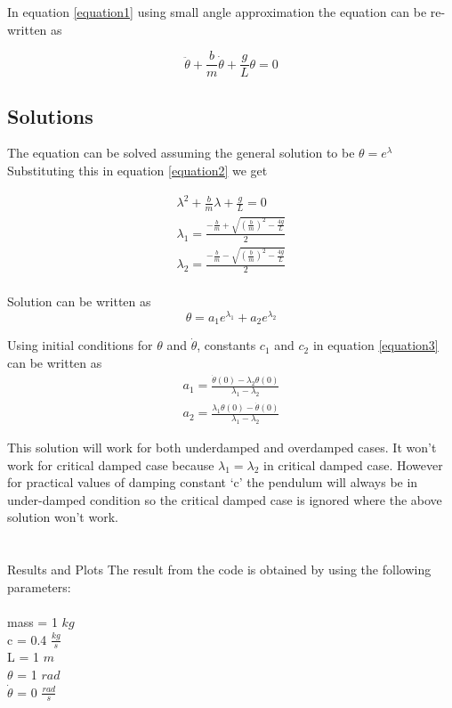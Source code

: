 \documentclass[12pt, a4paper]{report}
\begin{document}
In equation \ref{equation1} using small angle approximation the equation can be re-written as

\begin{equation}
\label{equation2}
\ddot{\theta} + \frac{b}{m}\dot{\theta} + \frac{g}{L}\theta = 0
\end{equation}

\subsection*{Solutions}
The equation can be solved assuming the general solution to be $\theta = e^{\lambda}$
Substituting this in equation \ref{equation2} we get

\begin{eqnarray}
\lambda^2 + \frac{b}{m}\lambda + \frac{g}{L} = 0\\
\lambda_1 = \frac{-\frac{b}{m} + \sqrt{(\frac{b}{m})^2 - \frac{4g}{L}}}{2}\\
\lambda_2 = \frac{-\frac{b}{m} - \sqrt{(\frac{b}{m})^2 - \frac{4g}{L}}}{2}\\
\end{eqnarray}

Solution can be written as 
\begin{equation}
\label{equation3}
\theta = a_1e^{\lambda_1} + a_2e^{\lambda_2}
\end{equation}

Using initial conditions for $\theta$ and $\dot{\theta}$, constants $c_1$ and $c_2$ in equation \ref{equation3} can be written as
\begin{eqnarray}
a_1 = \frac{\dot{\theta}(0) - \lambda_2\theta(0)}{\lambda_1 - \lambda_2}\\
a_2 = \frac{\lambda_1\theta(0) - \dot{\theta}(0)}{\lambda_1 - \lambda_2}
\end{eqnarray}

This solution will work for both underdamped and overdamped cases. It won't work for critical damped case because $\lambda_1=\lambda_2$ in critical damped case. However for practical values of damping constant `c' the pendulum will always be in under-damped condition so the critical damped case is ignored where the above solution won't work.

\section*{}{Results and Plots}
The result from the code is obtained by using the following parameters:\\\\
mass = 1 $kg$\\
c = 0.4 $\frac{kg}{s}$\\
L = 1 $m$\\
$\theta$ = 1 $rad$\\
$\dot{\theta}$ = 0 $\frac{rad}{s}$\\
\end{document}
